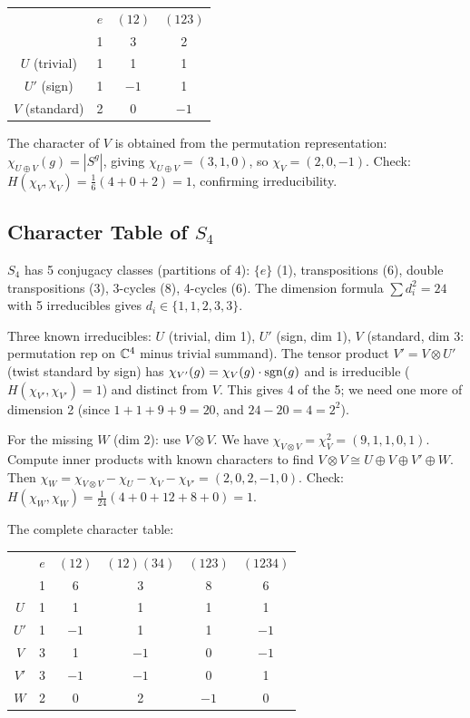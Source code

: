 \documentclass{report}
\begin{document}
\begin{center}
\begin{tabular}{c|ccc}
 & \(e\) & \((12)\) & \((123)\) \\
 & 1 & 3 & 2 \\ \hline
\(U\) (trivial) & 1 & 1 & 1 \\
\(U'\) (sign) & 1 & \(-1\) & 1 \\
\(V\) (standard) & 2 & 0 & \(-1\)
\end{tabular}
\end{center}

The character of \(V\) is obtained from the permutation representation: \(\chi_{U \oplus V}(g) = |S^g|\), giving \(\chi_{U \oplus V} = (3, 1, 0)\), so \(\chi_V = (2, 0, -1)\). Check: \(H(\chi_V, \chi_V) = \frac{1}{6}(4 + 0 + 2) = 1\), confirming irreducibility.

\subsection{Character Table of \(S_4\)}

\(S_4\) has 5 conjugacy classes (partitions of 4): \(\{e\}\) (1), transpositions (6), double transpositions (3), 3-cycles (8), 4-cycles (6). The dimension formula \(\sum d_i^2 = 24\) with 5 irreducibles gives \(d_i \in \{1, 1, 2, 3, 3\}\).

Three known irreducibles: \(U\) (trivial, dim 1), \(U'\) (sign, dim 1), \(V\) (standard, dim 3: permutation rep on \(\CC^4\) minus trivial summand). The tensor product \(V' = V \otimes U'\) (twist standard by sign) has \(\chi_{V'}(g) = \chi_V(g) \cdot \operatorname{sgn}(g)\) and is irreducible (\(H(\chi_{V'}, \chi_{V'}) = 1\)) and distinct from \(V\). This gives 4 of the 5; we need one more of dimension 2 (since \(1 + 1 + 9 + 9 = 20\), and \(24 - 20 = 4 = 2^2\)).

For the missing \(W\) (dim 2): use \(V \otimes V\). We have \(\chi_{V \otimes V} = \chi_V^2 = (9, 1, 1, 0, 1)\). Compute inner products with known characters to find \(V \otimes V \cong U \oplus V \oplus V' \oplus W\). Then \(\chi_W = \chi_{V \otimes V} - \chi_U - \chi_V - \chi_{V'} = (2, 0, 2, -1, 0)\). Check: \(H(\chi_W, \chi_W) = \frac{1}{24}(4 + 0 + 12 + 8 + 0) = 1\).

The complete character table:
\begin{center}
\begin{tabular}{c|ccccc}
 & \(e\) & \((12)\) & \((12)(34)\) & \((123)\) & \((1234)\) \\
 & 1 & 6 & 3 & 8 & 6 \\ \hline
\(U\) & 1 & 1 & 1 & 1 & 1 \\
\(U'\) & 1 & \(-1\) & 1 & 1 & \(-1\) \\
\(V\) & 3 & 1 & \(-1\) & 0 & \(-1\) \\
\(V'\) & 3 & \(-1\) & \(-1\) & 0 & 1 \\
\(W\) & 2 & 0 & 2 & \(-1\) & 0
\end{tabular}
\end{center}
\end{document}
